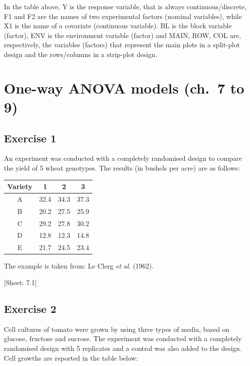 \documentclass[a4paper,12pt,oneside]{book}
\begin{document}
In the table above, Y is the response variable, that is always continuous/discrete, F1 and F2 are the names of two experimental factors (nominal variables), while X1 is the name of a covariate (continuous variable). BL is the block variable (factor), ENV is the environment variable (factor) and MAIN, ROW, COL are, respectively, the variables (factors) that represent the main plots in a split-plot design and the rows/columns in a strip-plot design.

\hypertarget{one-way-anova-models-ch.-7-to-9}{%
\section{One-way ANOVA models (ch.~7 to 9)}\label{one-way-anova-models-ch.-7-to-9}}

\hypertarget{exercise-1-5}{%
\subsection{Exercise 1}\label{exercise-1-5}}

An experiment was conducted with a completely randomised design to compare the yield of 5 wheat genotypes. The results (in bushels per acre) are as follows:

\begin{longtable}[]{@{}cccc@{}}
\toprule\noalign{}
Variety & 1 & 2 & 3 \\
\midrule\noalign{}
\endhead
\bottomrule\noalign{}
\endlastfoot
A & 32.4 & 34.3 & 37.3 \\
B & 20.2 & 27.5 & 25.9 \\
C & 29.2 & 27.8 & 30.2 \\
D & 12.8 & 12.3 & 14.8 \\
E & 21.7 & 24.5 & 23.4 \\
\end{longtable}

The example is taken from: Le Clerg \emph{et al}. (1962).

{[}Sheet: 7.1{]}

\hypertarget{exercise-2-5}{%
\subsection{Exercise 2}\label{exercise-2-5}}

Cell cultures of tomato were grown by using three types of media, based on glucose, fructose and sucrose. The experiment was conducted with a completely randomised design with 5 replicates and a control was also added to the design. Cell growths are reported in the table below:
\end{document}
